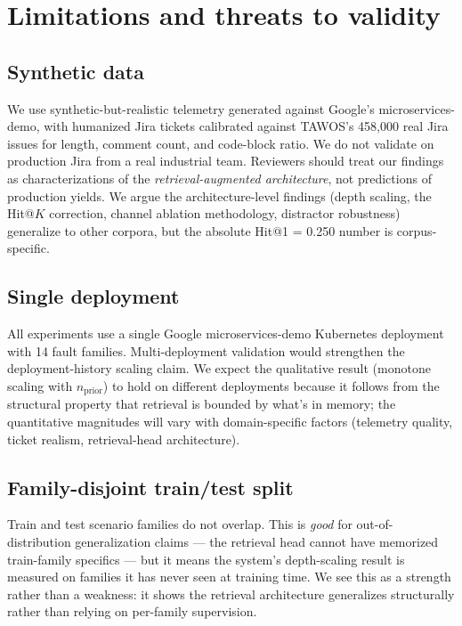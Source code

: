 \section{Limitations and threats to validity}
\label{sec:limitations}

\subsection{Synthetic data}

We use synthetic-but-realistic telemetry generated against Google's microservices-demo, with humanized Jira tickets calibrated against \textsc{TAWOS}'s 458{,}000 real Jira issues for length, comment count, and code-block ratio. We do not validate on production Jira from a real industrial team. Reviewers should treat our findings as characterizations of the \emph{retrieval-augmented architecture}, not predictions of production yields. We argue the architecture-level findings (depth scaling, the Hit@$K$ correction, channel ablation methodology, distractor robustness) generalize to other corpora, but the absolute Hit@1 = 0.250 number is corpus-specific.

\subsection{Single deployment}

All experiments use a single Google microservices-demo Kubernetes deployment with 14 fault families. Multi-deployment validation would strengthen the deployment-history scaling claim. We expect the qualitative result (monotone scaling with $n_{\text{prior}}$) to hold on different deployments because it follows from the structural property that retrieval is bounded by what's in memory; the quantitative magnitudes will vary with domain-specific factors (telemetry quality, ticket realism, retrieval-head architecture).

\subsection{Family-disjoint train/test split}

Train and test scenario families do not overlap. This is \emph{good} for out-of-distribution generalization claims --- the retrieval head cannot have memorized train-family specifics --- but it means the system's depth-scaling result is measured on families it has never seen at training time. We see this as a strength rather than a weakness: it shows the retrieval architecture generalizes structurally rather than relying on per-family supervision.


